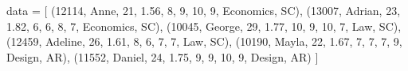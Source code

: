 \documentclass[
  11pt,
  letterpaper,
  DIV=11,
  numbers=noendperiod]{scrreprt}
\newenvironment{Shaded}{\begin{snugshade}}{\end{snugshade}}
\newcommand{\DecValTok}[1]{\textcolor[rgb]{0.68,0.00,0.00}{#1}}
\newcommand{\FloatTok}[1]{\textcolor[rgb]{0.68,0.00,0.00}{#1}}
\newcommand{\NormalTok}[1]{\textcolor[rgb]{0.00,0.23,0.31}{#1}}
\newcommand{\OperatorTok}[1]{\textcolor[rgb]{0.37,0.37,0.37}{#1}}
\newcommand{\StringTok}[1]{\textcolor[rgb]{0.13,0.47,0.30}{#1}}
\begin{document}
\begin{Shaded}
\begin{Highlighting}[]
\NormalTok{data }\OperatorTok{=}\NormalTok{ [}
\NormalTok{  (}\DecValTok{12114}\NormalTok{, }\StringTok{\textquotesingle{}Anne\textquotesingle{}}\NormalTok{, }\DecValTok{21}\NormalTok{, }\FloatTok{1.56}\NormalTok{, }\DecValTok{8}\NormalTok{, }\DecValTok{9}\NormalTok{, }\DecValTok{10}\NormalTok{, }\DecValTok{9}\NormalTok{, }\StringTok{\textquotesingle{}Economics\textquotesingle{}}\NormalTok{, }\StringTok{\textquotesingle{}SC\textquotesingle{}}\NormalTok{),}
\NormalTok{  (}\DecValTok{13007}\NormalTok{, }\StringTok{\textquotesingle{}Adrian\textquotesingle{}}\NormalTok{, }\DecValTok{23}\NormalTok{, }\FloatTok{1.82}\NormalTok{, }\DecValTok{6}\NormalTok{, }\DecValTok{6}\NormalTok{, }\DecValTok{8}\NormalTok{, }\DecValTok{7}\NormalTok{, }\StringTok{\textquotesingle{}Economics\textquotesingle{}}\NormalTok{, }\StringTok{\textquotesingle{}SC\textquotesingle{}}\NormalTok{),}
\NormalTok{  (}\DecValTok{10045}\NormalTok{, }\StringTok{\textquotesingle{}George\textquotesingle{}}\NormalTok{, }\DecValTok{29}\NormalTok{, }\FloatTok{1.77}\NormalTok{, }\DecValTok{10}\NormalTok{, }\DecValTok{9}\NormalTok{, }\DecValTok{10}\NormalTok{, }\DecValTok{7}\NormalTok{, }\StringTok{\textquotesingle{}Law\textquotesingle{}}\NormalTok{, }\StringTok{\textquotesingle{}SC\textquotesingle{}}\NormalTok{),}
\NormalTok{  (}\DecValTok{12459}\NormalTok{, }\StringTok{\textquotesingle{}Adeline\textquotesingle{}}\NormalTok{, }\DecValTok{26}\NormalTok{, }\FloatTok{1.61}\NormalTok{, }\DecValTok{8}\NormalTok{, }\DecValTok{6}\NormalTok{, }\DecValTok{7}\NormalTok{, }\DecValTok{7}\NormalTok{, }\StringTok{\textquotesingle{}Law\textquotesingle{}}\NormalTok{, }\StringTok{\textquotesingle{}SC\textquotesingle{}}\NormalTok{),}
\NormalTok{  (}\DecValTok{10190}\NormalTok{, }\StringTok{\textquotesingle{}Mayla\textquotesingle{}}\NormalTok{, }\DecValTok{22}\NormalTok{, }\FloatTok{1.67}\NormalTok{, }\DecValTok{7}\NormalTok{, }\DecValTok{7}\NormalTok{, }\DecValTok{7}\NormalTok{, }\DecValTok{9}\NormalTok{, }\StringTok{\textquotesingle{}Design\textquotesingle{}}\NormalTok{, }\StringTok{\textquotesingle{}AR\textquotesingle{}}\NormalTok{),}
\NormalTok{  (}\DecValTok{11552}\NormalTok{, }\StringTok{\textquotesingle{}Daniel\textquotesingle{}}\NormalTok{, }\DecValTok{24}\NormalTok{, }\FloatTok{1.75}\NormalTok{, }\DecValTok{9}\NormalTok{, }\DecValTok{9}\NormalTok{, }\DecValTok{10}\NormalTok{, }\DecValTok{9}\NormalTok{, }\StringTok{\textquotesingle{}Design\textquotesingle{}}\NormalTok{, }\StringTok{\textquotesingle{}AR\textquotesingle{}}\NormalTok{)}
\NormalTok{]}


\end{Highlighting}
\end{Shaded}
\end{document}
